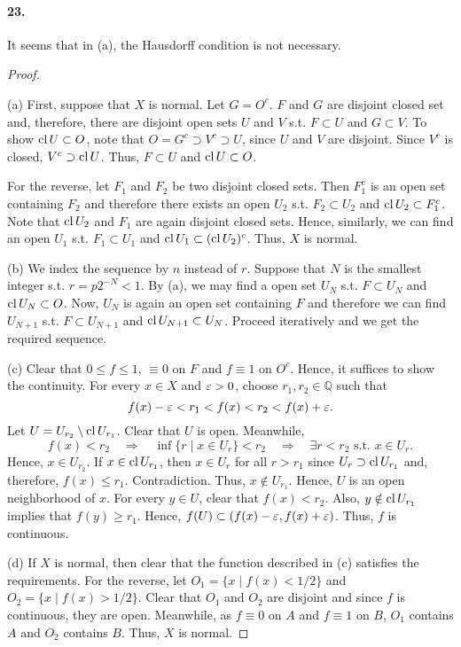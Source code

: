 \paragraph{23.}
  It seems that in (a), the Hausdorff condition is not necessary. 
\begin{proof}
  $\,$\par
  (a) First, suppose that $X$ is normal. Let $G = O^c$. $F$ and $G$
  are disjoint closed set and, therefore, there are disjoint open sets $U$ and
  $V$ s.t. $F\subset U$ and $G\subset V$. To show $\operatorname{cl} U\subset O$, note that
  $O = G^c \supset V^c \supset U$, since $U$ and $V$ are disjoint. Since $V^c$
  is closed, $V^c \supset \operatorname{cl} U$. Thus, $F\subset U$ and $\operatorname{cl} U \subset O$.
  
  For the reverse, let $F_1$ and $F_2$ be two disjoint closed sets. Then
  $F_1^c$ is an open set containing $F_2$ and therefore there exists an open
  $U_2$ s.t. $F_2 \subset U_2$ and $\operatorname{cl} U_2\subset F_1^c$. Note that $\operatorname{cl} U_2$
  and $F_1$ are again disjoint closed sets. Hence, similarly, we can find an
  open $U_1$ s.t. $F_1\subset U_1$ and $\operatorname{cl} U_1 \subset (\operatorname{cl} U_2)^c$. Thus, 
  $X$ is normal.  

  (b) We index the sequence by $n$ instead of $r$. Suppose that $N$ is the
  smallest integer s.t. $r = p2^{-N} < 1$. By (a), we may find a open set
  $U_{N}$ s.t. $F\subset U_N$ and $\operatorname{cl} U_N\subset O$. Now, $U_N$ is again an
  open set containing $F$ and therefore we can find $U_{N+1}$ s.t. 
  $F\subset U_{N+1}$ and $\operatorname{cl} U_{N+1} \subset U_N$. Proceed iteratively and 
  we get the required sequence. 
  
  (c) Clear that $0 \le f \le 1$, $\equiv 0$ on $F$ and $f\equiv 1$ on $O^c$. 
  Hence, it suffices to show the continuity. For every $x \in X$ and $\varepsilon> 0$,
  choose $r_1, r_2 \in \mathbb{Q}$ such that 
  \[
    f(x) - \varepsilon < r_1 < f(x) < r_2 < f(x) + \varepsilon.
  \]
  Let $U = U_{r_2} \setminus \operatorname{cl} U_{r_1}$. Clear that $U$ is open. Meanwhile,
  \[
    f(x) < r_2 \quad\Rightarrow\quad
    \inf\{r\mid x \in U_r\} < r_2 \quad\Rightarrow\quad
    \exists r < r_2 \text{ s.t. } x \in U_r.
  \]
  Hence, $x \in U_{r_2}$. If $x \in \operatorname{cl} U_{r_1}$, then $x \in U_r$ for all
  $r > r_1$ since $U_r \supset \operatorname{cl} U_{r_1}$ and, therefore, $f(x) \le r_1$. 
  Contradiction. Thus, $x \notin U_{r_1}$. Hence, $U$ is an open neighborhood
  of $x$. For every $y \in U$, clear that $f(x) < r_2$. Also, $y \notin 
  \operatorname{cl} U_{r_1}$ implies that $f(y) \ge r_1$. Hence, $f(U)\subset (f(x) - \varepsilon,
  f(x) + \varepsilon)$. Thus, $f$ is continuous. 
  
  (d) If $X$ is normal, then clear that the function described in (c) satisfies
  the requirements. For the reverse, let $O_1 = \{x\mid f(x) < 1/2\}$ and 
  $O_2 = \{x \mid f(x) > 1/2\}$. Clear that $O_1$ and $O_2$ are disjoint and
  since $f$ is continuous, they are open. Meanwhile, as $f\equiv 0$ on $A$
  and $f\equiv 1$ on $B$, $O_1$ contains $A$ and $O_2$ contains $B$. Thus,
  $X$ is normal.
\end{proof}

